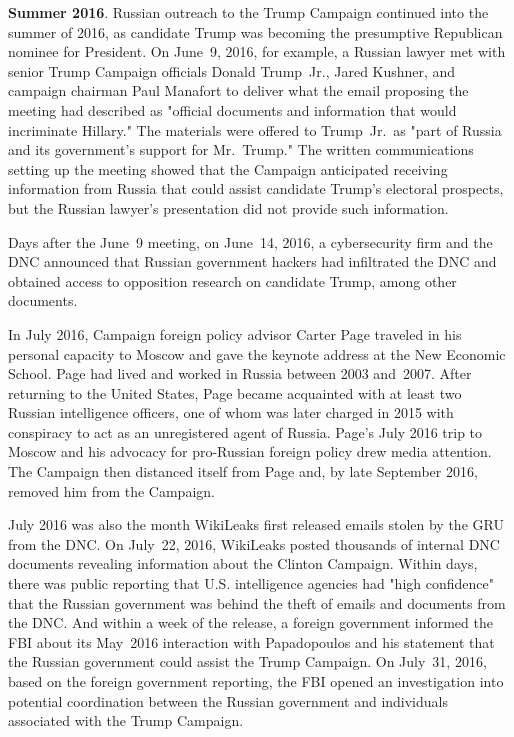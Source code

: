 \textbf{Summer 2016}.
Russian outreach to the Trump Campaign continued into the summer of 2016, as candidate Trump was becoming the presumptive Republican nominee for President.
On June~9, 2016, for example, a Russian lawyer met with senior Trump Campaign officials Donald Trump~Jr., Jared Kushner, and campaign chairman Paul Manafort to deliver what the email proposing the meeting had described as "official documents and information that would incriminate Hillary."
The materials were offered to Trump~Jr.\ as "part of Russia and its government's support for Mr.~Trump."
The written communications setting up the meeting showed that the Campaign anticipated receiving information from Russia that could assist candidate Trump's electoral prospects, but the Russian lawyer's presentation did not provide such information.

Days after the June~9 meeting, on June~14, 2016, a cybersecurity firm and the DNC announced that Russian government hackers had infiltrated the DNC and obtained access to opposition research on candidate Trump, among other documents.

In July 2016, Campaign foreign policy advisor Carter Page traveled in his personal capacity to Moscow and gave the keynote address at the New Economic School.
Page had lived and worked in Russia between 2003 and~2007.
After returning to the United States, Page became acquainted with at least two Russian intelligence officers, one of whom was later charged in 2015 with conspiracy to act as an unregistered agent of Russia.
Page's July 2016 trip to Moscow and his advocacy for pro-Russian foreign policy drew media attention.
The Campaign then distanced itself from Page and, by late September 2016, removed him from the Campaign.

July 2016 was also the month WikiLeaks first released emails stolen by the GRU from the DNC\null.
On July~22, 2016, WikiLeaks posted thousands of internal DNC documents revealing information about the Clinton Campaign.
Within days, there was public reporting that U.S. intelligence agencies had "high confidence" that the Russian government was behind the theft of emails and documents from the DNC\null.
And within a week of the release, a foreign government informed the FBI about its May~2016 interaction with Papadopoulos and his statement that the Russian government could assist the Trump Campaign.
On July~31, 2016, based on the foreign government reporting, the FBI opened an investigation into potential coordination between the Russian government and individuals associated with the Trump Campaign.

